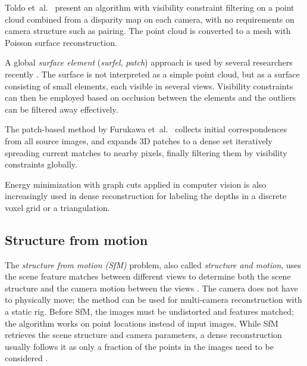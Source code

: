 Toldo et~al.~\cite{toldo2013accurate,toldo2013towards} present an algorithm with visibility constraint filtering on a point cloud combined from a disparity map on each camera, with no requirements on camera structure such as pairing.
The point cloud is converted to a mesh with Poisson surface reconstruction.

A global \emph{surface element} (\emph{surfel}, \emph{patch}) approach is used by several researchers recently \cite{carceroni2002multi,furukawa2010accurate,vu2012high,chang2011gpu}.
The surface is not interpreted as a simple point cloud, but as a surface consisting of small elements, each visible in several views.
Visibility constraints can then be employed based on occlusion between the elements and the outliers can be filtered away effectively.

The patch-based method by Furukawa et~al.~\cite{furukawa2012patch,furukawa2010accurate} collects initial correspondences from all source images, and expands 3D patches to a dense set iteratively spreading current matches to nearby pixels, finally filtering them by visibility constraints globally.

Energy minimization with graph cuts applied in computer vision \cite{boykov2004experimental} is also increasingly used in dense reconstruction \cite{chang2011gpu,vu2012high,labatut2009robust,jancosek2011multi} for labeling the depths in a discrete voxel grid or a triangulation.


\subsection{Structure from motion} \label{sec:sfm} %


The \emph{structure from motion (SfM)} problem, also called \emph{structure and motion}, uses the scene feature matches between different views to determine both the scene structure and the camera motion between the views \cite{snavely2006photo,fitzgibbon1998automatic,pollefeys2004visual}.
The camera does not have to physically move; the method can be used for multi-camera reconstruction with a static rig.
Before SfM, the images must be undistorted and features matched; the algorithm works on point locations instead of input images.
While SfM retrieves the scene structure and camera parameters, a dense reconstruction usually follows it as only a fraction of the points in the images need to be considered \cite{pollefeys2004visual}.

